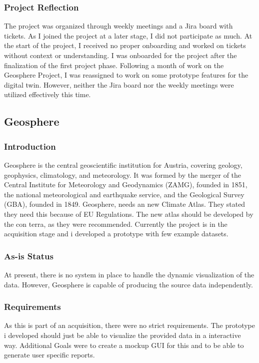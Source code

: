 \documentclass[11pt, titlepage, a4paper]{article}
\begin{document}
\subsubsection{Project Reflection}
The project was organized through weekly meetings and a Jira board with tickets. As I joined the project at a later stage, I did not participate as much. At the start of the project, I received no proper onboarding and worked on tickets without context or understanding. I was onboarded for the project after the finalization of the first project phase. Following a month of work on the Geosphere Project, I was reassigned to work on some prototype features for the digital twin. However, neither the Jira board nor the weekly meetings were utilized effectively this time.

\subsection{Geosphere}
\subsubsection{Introduction}
Geosphere is the central geoscientific institution for Austria, covering geology, geophysics, climatology, and meteorology.  It was formed by the merger of the Central Institute for Meteorology and Geodynamics (ZAMG), founded in 1851, the national meteorological and earthquake service, and the Geological Survey (GBA), founded in 1849. 
Geosphere, needs an new Climate Atlas. They stated they need this because of EU Regulations. The new atlas should be developed by the con terra, as they were recommended. Currently the project is in the acquisition stage and i developed a prototype with few example datasets.

\subsubsection{As-is Status}
At present, there is no system in place to handle the dynamic visualization of the data. However, Geosphere is capable of producing the source data independently. 
\subsubsection{Requirements}
As this is part of an acquisition, there were no strict requirements. The prototype i developed should just be able to visualize the provided data in a interactive way. Additional Goals were to create a mockup GUI for this and to be able to generate user specific reports. 
\end{document}
